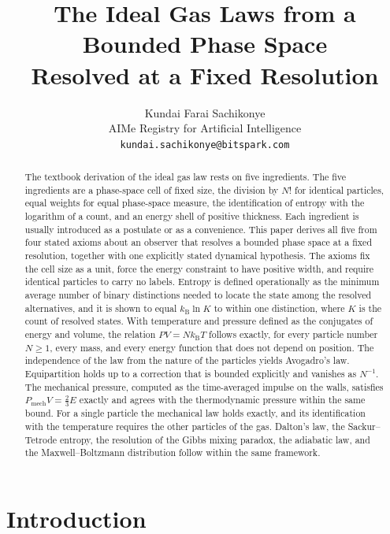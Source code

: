 \documentclass[11pt,a4paper]{article}
\title{\textbf{The Ideal Gas Laws from a Bounded Phase Space\\Resolved at a Fixed Resolution}}
\author{
Kundai Farai Sachikonye\\
AIMe Registry for Artificial Intelligence\\
\texttt{kundai.sachikonye@bitspark.com}
}
\date{}
\theoremstyle{definition}
\theoremstyle{remark}
\newcommand{\kB}{k_{\mathrm{B}}}
\newcommand{\Pmech}{P_{\mathrm{mech}}}
\begin{document}
\maketitle

\begin{abstract}
\noindent
The textbook derivation of the ideal gas law rests on five ingredients.
The five ingredients are a phase-space cell of fixed size, the division by $N!$ for identical particles, equal weights for equal phase-space measure, the identification of entropy with the logarithm of a count, and an energy shell of positive thickness.
Each ingredient is usually introduced as a postulate or as a convenience.
This paper derives all five from four stated axioms about an observer that resolves a bounded phase space at a fixed resolution, together with one explicitly stated dynamical hypothesis.
The axioms fix the cell size as a unit, force the energy constraint to have positive width, and require identical particles to carry no labels.
Entropy is defined operationally as the minimum average number of binary distinctions needed to locate the state among the resolved alternatives, and it is shown to equal $\kB\ln K$ to within one distinction, where $K$ is the count of resolved states.
With temperature and pressure defined as the conjugates of energy and volume, the relation $PV=N\kB T$ follows exactly, for every particle number $N\ge1$, every mass, and every energy function that does not depend on position.
The independence of the law from the nature of the particles yields Avogadro's law.
Equipartition holds up to a correction that is bounded explicitly and vanishes as $N^{-1}$.
The mechanical pressure, computed as the time-averaged impulse on the walls, satisfies $\Pmech V=\tfrac23 E$ exactly and agrees with the thermodynamic pressure within the same bound.
For a single particle the mechanical law holds exactly, and its identification with the temperature requires the other particles of the gas.
Dalton's law, the Sackur--Tetrode entropy, the resolution of the Gibbs mixing paradox, the adiabatic law, and the Maxwell--Boltzmann distribution follow within the same framework.
\end{abstract}

\tableofcontents

\section{Introduction}
\label{sec:intro}
\end{document}
